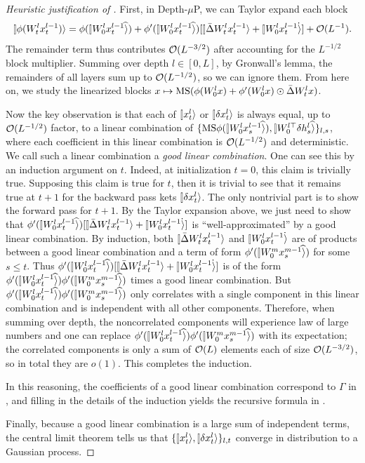 \documentclass{article}
\theoremstyle{plain}
\theoremstyle{definition}
\begin{document}
\begin{proof}[Heuristic justification of ]
First, in Depth-$\mu$P, we can Taylor expand each block
$$\ket{\phi(W^l_t x^{l-1}_t)} = \phi(\hatket{W^l_0 x^{l-1}_t}) + \phi'(\hatket{W^l_0 x^{l-1}_t}) [\ket{\bar\Delta W^l_t x^{l-1}_t} + \dotket{W^l_0 x^{l-1}_t}] + \cO(L^{-1}).$$
The remainder term thus contributes $\mathcal{O}(L^{-3/2})$ after accounting for the $L^{-1/2}$ block multiplier. Summing over depth $l \in [0, L]$, by Gronwall's lemma, the remainders of all layers sum up to $\mathcal{O}(L^{-1/2})$, so we can ignore them.
From here on, we study the linearized blocks $x \mapsto \mathrm{MS}(\phi(W^l_0 x) + \phi'(W^l_0 x) \odot \bar\Delta W^l_t x)$.

Now the key observation is that each of $\ket{x^l_t}$ or $\ket{\delta x^l_t}$ is always equal, up to $\mathcal{O}(L^{-1/2})$ factor, to a linear combination of $\{\MS \phi(\hatket{W^l_0 x^{l-1}_s}), \hatket{W^{l \trsp}_0 \delta h^l_s}\}_{l, s}$, where each coefficient in this linear combination is $\mathcal{O}(L^{-1/2})$ and deterministic.
We call such a linear combination a \emph{good linear combination}.
One can see this by an induction argument on $t$.
Indeed, at initialization $t=0$, this claim is trivially true.
Supposing this claim is true for $t$, then it is trivial to see that it remains true at $t+1$ for the backward pass kets $\ket{\delta x^l_t}$.
The only nontrivial part is to show the forward pass for $t+1$.
By the Taylor expansion above, we just need to show that $\phi'(\hatket{W^l_0 x^{l-1}_t}) [\ket{\bar\Delta W^l_t x^{l-1}_t} + \dotket{W^l_0 x^{l-1}_t}]$ is ``well-approximated'' by a good linear combination.
By induction, both $\ket{\bar\Delta W^l_t x^{l-1}_t}$ and $\dotket{W^l_0 x^{l-1}_t}$ are of products between a good linear combination and a term of form $ \phi'(\hatket{W^m_0 x^{m-1}_s})$ for some $s \le t$. Thus $\phi'(\hatket{W^l_0 x^{l-1}_t}) [\ket{\bar\Delta W^l_t x^{l-1}_t} + \dotket{W^l_0 x^{l-1}_t}]$ is of the form $\phi'(\hatket{W^l_0 x^{l-1}_t})\phi'(\hatket{W^m_0 x^{m-1}_s})$ times a good linear combination.
But $\phi'(\hatket{W^l_0 x^{l-1}_t})\phi'(\hatket{W^m_0 x^{m-1}_s})$ only correlates with a single component in this linear combination and is independent with all other components.
Therefore, when summing over depth, the noncorrelated components will experience law of large numbers and one can replace $\phi'(\hatket{W^l_0 x^{l-1}_t})\phi'(\hatket{W^m_0 x^{m-1}_s})$ with its expectation; the correlated components is only a sum of $\mathcal{O}(L)$ elements each of size $\mathcal{O}(L^{-3/2})$, so in total they are $o(1)$.
This completes the induction.

In this reasoning, the coefficients of a good linear combination correspond to $\Gamma$ in , and filling in the details of the induction yields the recursive formula in .

Finally, because a good linear combination is a large sum of independent terms, the central limit theorem tells us that $\{\ket{x^l_t}, \ket{\delta x^l_t}\}_{l, t}$ converge in distribution to a Gaussian process.
\end{proof}
\end{document}

